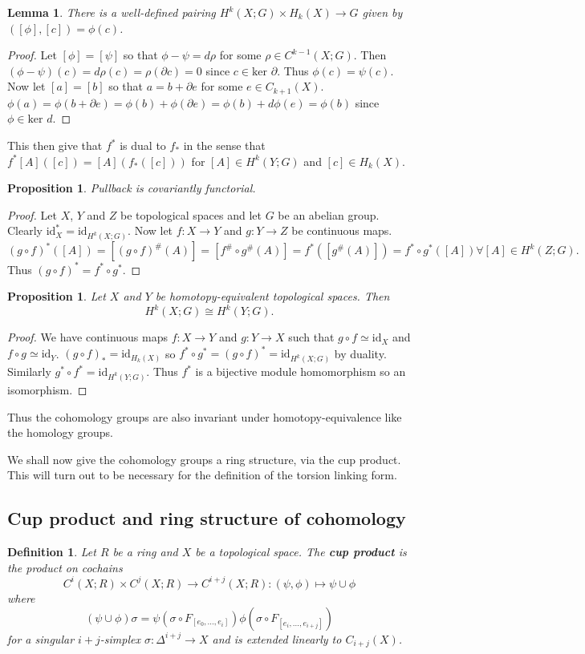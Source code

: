 \documentclass{article}
\newtheorem{definition}[theorem]{Definition}
\newtheorem{lemma}[theorem]{Lemma}
\newtheorem{proposition}[theorem]{Proposition}
\begin{document}
\begin{lemma}
There is a well-defined pairing $H^k(X;G)\times H_k(X)\to G$ given by $([\phi],[c])=\phi(c)$.
\end{lemma}
\begin{proof}
Let $[\phi]=[\psi]$ so that $\phi-\psi=d\rho$ for some $\rho\in C^{k-1}(X;G)$. Then $(\phi-\psi)(c)=d\rho(c)=\rho(\partial c)=0$ since $c\in\text{ker }\partial$. Thus $\phi(c)=\psi(c)$.
Now let $[a]=[b]$ so that $a=b+\partial e$ for some $e\in C_{k+1}(X)$. $\phi(a)=\phi(b+\partial e)=\phi(b)+\phi(\partial e)=\phi(b)+d\phi(e)=\phi(b)$ since $\phi\in\text{ker }d$.
\end{proof}

\noindent This then give that $f^*$ is dual to $f_*$ in the sense that $f^*[A]([c])=[A](f_*([c]))$ for $[A]\in H^k(Y;G)$ and $[c]\in H_k(X)$.

\begin{proposition}
Pullback is covariantly functorial.
\end{proposition}
\begin{proof}
Let $X$, $Y$ and $Z$ be topological spaces and let $G$ be an abelian group. 
Clearly $\text{id}_X^*=\text{id}_{H^k(X;G)}$.
Now let $f\colon X\to Y$ and $g\colon Y\to Z$ be continuous maps. \[(g\circ f)^*([A])=[(g\circ f)^\#(A)]=[f^\#\circ g^\#(A)]=f^*([g^\#(A)])=f^*\circ g^*([A])\forall [A]\in H^k(Z;G).\] Thus $(g\circ f)^*=f^*\circ g^*$.
\end{proof}

\begin{proposition}
Let $X$ and $Y$ be homotopy-equivalent topological spaces. Then \[H^k(X;G)\cong H^k(Y;G).\]
\end{proposition}
\begin{proof}
We have continuous maps $f\colon X\to Y$ and $g\colon Y\to X$ such that $g\circ f\simeq\text{id}_X$ and $f\circ g\simeq\text{id}_Y$. $(g\circ f)_*=\text{id}_{H_k(X)}$ so $f^*\circ g^*=(g\circ f)^*=\text{id}_{H^k(X;G)}$ by duality. Similarly $g^*\circ f^*=\text{id}_{H^k(Y;G)}$. Thus $f^*$ is a bijective module homomorphism so an isomorphism.
\end{proof}
\noindent Thus the cohomology groups are also invariant under homotopy-equivalence like the homology groups.

\noindent We shall now give the cohomology groups a ring structure, via the cup product. This will turn out to be necessary for the definition of the torsion linking form.

\subsection{Cup product and ring structure of cohomology}
\begin{definition}
Let $R$ be a ring and $X$ be a topological space. The \textbf{cup product} is the product on cochains\[C^i(X;R)\times C^j(X;R)\to C^{i+j}(X;R):(\psi,\phi)\mapsto\psi\cup\phi\] where \[(\psi\cup\phi)\sigma=\psi(\sigma\circ F_{[e_0,...,e_i]})\phi(\sigma\circ F_{[e_i,...,e_{i+j}]})\] for a singular $i+j$-simplex $\sigma\colon\Delta^{i+j}\to X$ and is extended linearly to $C_{i+j}(X)$.
\end{definition}
\end{document}
